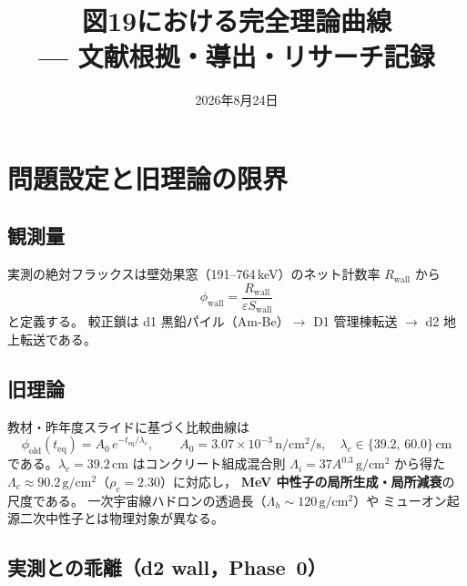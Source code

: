 \documentclass[a4paper,11pt]{ltjsarticle}
\title{図19における完全理論曲線\\--- 文献根拠・導出・リサーチ記録}
\date{2026年8月24日}
\begin{document}
\maketitle


\tableofcontents
\newpage

\section{問題設定と旧理論の限界}

\subsection{観測量}

実測の絶対フラックスは壁効果窓（191--764\,keV）のネット計数率 $R_{\mathrm{wall}}$ から
\begin{equation}
  \phi_{\mathrm{wall}}
  = \frac{R_{\mathrm{wall}}}{\varepsilon S_{\mathrm{wall}}}
\end{equation}
と定義する\cite{yoneuchi2002}。
較正鎖は d1 黒鉛パイル（Am-Be）$\to$ D1 管理棟転送 $\to$ d2 地上転送である\cite{CONTEXT}。

\subsection{旧理論}

教材・昨年度スライドに基づく比較曲線は
\begin{equation}
  \phi_{\mathrm{old}}(t_{\mathrm{eq}})
  = A_0\,e^{-t_{\mathrm{eq}}/\lambda_c},
  \qquad
  A_0 = 3.07\times10^{-3}\,\mathrm{n/cm^2/s},
  \quad
  \lambda_c \in \{39.2,\,60.0\}\,\mathrm{cm}
\end{equation}
である。$\lambda_c=39.2$\,cm はコンクリート組成混合則
$\Lambda_i=37 A^{0.3}\,\mathrm{g/cm^2}$ から得た
$\Lambda_c\approx90.2\,\mathrm{g/cm^2}$（$\rho_c=2.30$）に対応し，
\textbf{MeV 中性子の局所生成・局所減衰}の尺度である\cite{equiv,S0}。
一次宇宙線ハドロンの透過長（$\Lambda_h\sim120\,\mathrm{g/cm^2}$）や
ミューオン起源二次中性子とは物理対象が異なる。

\subsection{実測との乖離（d2 wall，Phase~0）}
\end{document}
